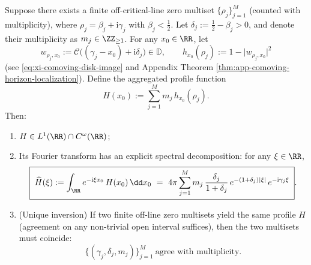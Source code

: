 \begin{theorem}\label{thm:xi-comoving-horizon-scan-fourier-inversion}
Suppose there exists a finite off-critical-line zero multiset \(\{\rho_j\}_{j=1}^{M}\) (counted with multiplicity), where
\(
\rho_j=\beta_j+\mathrm{i}\gamma_j
\)
with \(\beta_j<\tfrac12\).
Let \(\delta_j:=\tfrac12-\beta_j>0\), and denote their multiplicity as \(m_j\in\ZZ_{\ge 1}\).
For any \(x_0\in\RR\), let
\[
w_{\rho_j,x_0}:=\mathcal{C}\bigl((\gamma_j-x_0)+\mathrm{i}\delta_j\bigr)\in\mathbb{D},
\qquad
h_{x_0}(\rho_j):=1-\bigl|w_{\rho_j,x_0}\bigr|^2
\]
(see \eqref{eq:xi-comoving-disk-image} and Appendix Theorem \ref{thm:app-comoving-horizon-localization}).
Define the aggregated profile function
\[
H(x_0):=\sum_{j=1}^{M} m_j\,h_{x_0}(\rho_j).
\]
Then:
\begin{enumerate}
  \item \(H\in L^1(\RR)\cap C^{\omega}(\RR)\);
  \item Its Fourier transform has an explicit spectral decomposition: for any \(\xi\in\RR\),
  \begin{equation}\label{eq:xi-comoving-horizon-scan-fourier}
  \boxed{\;
  \widehat H(\xi)
  :=\int_{\RR}e^{-\mathrm{i}\xi x_0}\,H(x_0)\,\dd x_0
  ~=~
  4\pi\sum_{j=1}^{M} m_j\,\frac{\delta_j}{1+\delta_j}\,
  e^{-(1+\delta_j)|\xi|}\,e^{-\mathrm{i}\gamma_j\xi}\; }.
  \end{equation}
  \item (Unique inversion) If two finite off-line zero multisets yield the same profile \(H\) (agreement on any non-trivial open interval suffices), then the two multisets must coincide:
  \[
  \{(\gamma_j,\delta_j,m_j)\}_{j=1}^{M}\ \text{agree with multiplicity}.
  \]
\end{enumerate}
\end{theorem}

